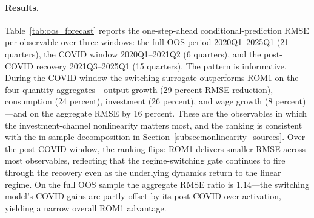 \documentclass[12pt]{article}
\theoremstyle{plain}
\theoremstyle{definition}
\theoremstyle{remark}
\begin{document}
\paragraph{Results.} Table~\ref{tab:oos_forecast} reports the one-step-ahead conditional-prediction RMSE per observable over three windows: the full OOS period 2020Q1--2025Q1 (21 quarters), the COVID window 2020Q1--2021Q2 (6 quarters), and the post-COVID recovery 2021Q3--2025Q1 (15 quarters). The pattern is informative. During the COVID window the switching surrogate outperforms ROM1 on the four quantity aggregates---output growth (29 percent RMSE reduction), consumption (24 percent), investment (26 percent), and wage growth (8 percent)---and on the aggregate RMSE by 16 percent. These are the observables in which the investment-channel nonlinearity matters most, and the ranking is consistent with the in-sample decomposition in Section~\ref{subsec:nonlinearity_sources}. Over the post-COVID window, the ranking flips: ROM1 delivers smaller RMSE across most observables, reflecting that the regime-switching gate continues to fire through the recovery even as the underlying dynamics return to the linear regime. On the full OOS sample the aggregate RMSE ratio is $1.14$---the switching model's COVID gains are partly offset by its post-COVID over-activation, yielding a narrow overall ROM1 advantage.
\end{document}
